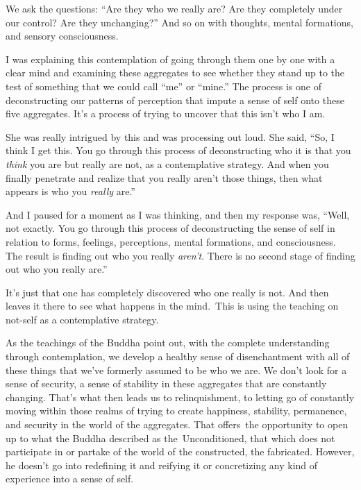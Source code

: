We ask the questions: ``Are they who we really are? Are they completely under our control? Are they unchanging?'' And so on with thoughts, mental formations, and sensory consciousness.

I was explaining this contemplation of going through them one by one with a clear mind and examining these aggregates to see whether they stand up to the test of something that we could call ``me'' or ``mine.'' The process is one of deconstructing our patterns of perception that impute a sense of self onto these five aggregates. It's a process of trying to uncover that this isn't who I am.

She was really intrigued by this and was processing out \linebreak loud. She said, ``So, I think I get this. You go through this process of deconstructing who it is that you \emph{think} you are but really are not, as a contemplative strategy. And when you finally penetrate and realize that you really aren't those things, then what appears is who you \emph{really} are.''

And I paused for a moment as I was thinking, and then my response was, ``Well, not exactly. You go through this process of deconstructing the sense of self in relation to forms, feelings, perceptions, mental formations, and consciousness. The result is finding out who you really \emph{aren't}. There is no second stage of finding out who you really are.''

It's just that one has completely discovered who one really is not. And then leaves it there to see what happens in the \mbox{mind. This} is using the teaching on not-self as a contemplative strategy.

As the teachings of the Buddha point out, with the complete understanding through contemplation, we develop a healthy sense of disenchantment with all of these things that we've formerly assumed to be who we are. We don't look for a sense of security, a sense of stability in these aggregates that are constantly changing. That's what then leads us to relinquishment, to letting go of constantly moving within those realms of trying to create happiness, stability, permanence, and security in the world of the aggregates. That \mbox{offers the} opportunity to open up to what the Buddha described as \mbox{the Unconditioned}, that which does not participate in or partake of the world of the constructed, the fabricated. However, he doesn't go into redefining it and reifying it or concretizing any kind of experience into a sense of self.

